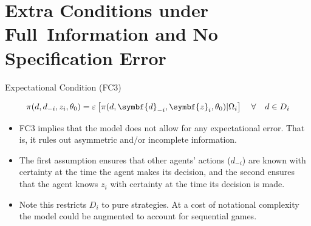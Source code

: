 \documentclass[aspectratio=169,11pt]{beamer}
\begin{document}
\section{Extra Conditions under Full\ Information and No Specification Error}
\begin{frame}{Expectational Condition (FC3)}

\begin{equation*}
\pi (d,d_{-i},z_{i},\theta _{0})=\varepsilon \left[ \pi (d,\symbf{d}%
_{-i},\symbf{z}_{i},\theta _{0})| \Omega_i \right] \text{ \hspace{0.1in}} \forall  \text{ \hspace{0.1in}} d\in D_{i}
\end{equation*}
\begin{itemize}
\item FC3 implies that the model does not allow for any expectational error. That
is, it rules out asymmetric and/or incomplete information.
\item The first assumption ensures that other agents' actions ($d_{-i}$) are known with certainty at the time
the agent makes its decision, and the second ensures that the agent knows $z_{i}$ with certainty at the time its decision is made. 
\item  Note this restricts $D_i$ to pure strategies.  At a cost of notational complexity the model could be augmented to account for sequential games.
\end{itemize}
\end{frame}
\end{document}
